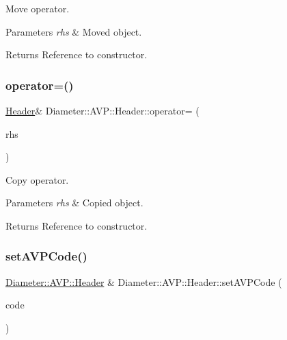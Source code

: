 Move operator. 


\begin{DoxyParams}{Parameters}
{\em rhs} & Moved object. \\
\hline
\end{DoxyParams}
\begin{DoxyReturn}{Returns}
Reference to constructor. 
\end{DoxyReturn}
\mbox{\label{classDiameter_1_1AVP_1_1Header_a739d3c2f35b5e7bdb1072668e69ae1b5}} 
\subsubsection{\texorpdfstring{operator=()}{operator=()}\hspace{0.1cm}{\footnotesize\ttfamily [2/2]}}
{\footnotesize\ttfamily \hyperlink{classDiameter_1_1AVP_1_1Header}{Header}\& Diameter\+::\+A\+V\+P\+::\+Header\+::operator= (\begin{DoxyParamCaption}\item[{const \hyperlink{classDiameter_1_1AVP_1_1Header}{Header} \&}]{rhs }\end{DoxyParamCaption})\hspace{0.3cm}{\ttfamily [default]}}



Copy operator. 


\begin{DoxyParams}{Parameters}
{\em rhs} & Copied object. \\
\hline
\end{DoxyParams}
\begin{DoxyReturn}{Returns}
Reference to constructor. 
\end{DoxyReturn}
\mbox{\label{classDiameter_1_1AVP_1_1Header_a74ba1debad513ac3eaebf760228ee9c0}} 
\subsubsection{\texorpdfstring{set\+A\+V\+P\+Code()}{setAVPCode()}}
{\footnotesize\ttfamily \hyperlink{classDiameter_1_1AVP_1_1Header}{Diameter\+::\+A\+V\+P\+::\+Header} \& Diameter\+::\+A\+V\+P\+::\+Header\+::set\+A\+V\+P\+Code (\begin{DoxyParamCaption}\item[{A\+V\+P\+Code\+Type}]{code }\end{DoxyParamCaption})}



